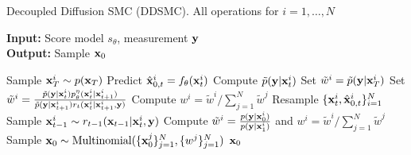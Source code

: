 \begin{algorithm}[tb]
   \caption{Decoupled Diffusion SMC (DDSMC). All operations for $i=1, \dots, N$}
   \label{algo:ddsmc}
   \hspace*{\algorithmicindent} \textbf{Input:}
   Score model $s_\theta$, 
   measurement $\mathbf{y}$
   \\
   \hspace*{\algorithmicindent} \textbf{Output:} Sample $\mathbf{x}_0$
\begin{algorithmic}
\STATE Sample $\mathbf{x}_T^i \sim p(\mathbf{x}_T)$
\STATE Predict $\hat {\mathbf{x}}_{0, t}^i = f_\theta(\mathbf{x}_{t}^i)$
\STATE Compute $\tilde p(\mathbf{y}|\mathbf{x}_{t}^i)$ 
\STATE Set $\tilde w^i = \tilde p(\mathbf{y} |\mathbf{x}_T^i)$ 
\ELSE
\STATE Set $\tilde w^i = \frac{\tilde p(\mathbf{y} |\mathbf{x}_{t}^i)p_\theta^\eta(\mathbf{x}_{t}^i|\mathbf{x}_{t+1}^i)}{\tilde p(\mathbf{y} |\mathbf{x}_{t+1}^i) r_t(\mathbf{x}_{t}^i|\mathbf{x}_{t+1}^i, \mathbf{y})}$
\ENDIF
\STATE Compute  $w^i = \tilde w^i /\sum_{j=1}^N \tilde w^j$
\STATE Resample $\{\mathbf{x}_t^i, \hat {\mathbf{x}}_{0, t}^i\}_{i=1}^N$
\STATE Sample $\mathbf{x}_{t-1}^i \sim r_{t-1}(\mathbf{x}_{t-1}|\mathbf{x}_{t}^i, \mathbf{y})$ 
\ENDFOR
\STATE Compute $\tilde w^i = \frac{p(\mathbf{y} | \mathbf{x}_0^i)}{p(\mathbf{y} | \mathbf{x}_1^i)}$ and $w^i = \tilde w^i /\sum_{j=1}^N \tilde w^j$
\STATE Sample $\mathbf{x}_0\sim \text{Multinomial}(\{\mathbf{x}_0^j\}_{j=1}^N, \{w^j\}_{j=1}^N)$
\RETURN $\mathbf{x}_0$ 
\end{algorithmic}
\end{algorithm}
